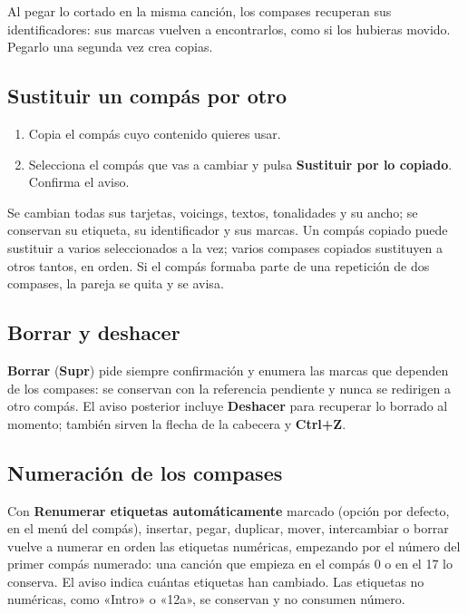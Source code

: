 \documentclass[a4paper,11pt]{article}
\providecommand{\tightlist}{\setlength{\itemsep}{2pt}\setlength{\parskip}{0pt}}
\begin{document}
Al pegar lo cortado en la misma canción, los compases recuperan sus
identificadores: sus marcas vuelven a encontrarlos, como si los hubieras
movido. Pegarlo una segunda vez crea copias.

\subsection{Sustituir un compás por
otro}\label{sustituir-un-compuxe1s-por-otro}

\begin{enumerate}
\def\labelenumi{\arabic{enumi}.}
\tightlist
\item
  Copia el compás cuyo contenido quieres usar.
\item
  Selecciona el compás que vas a cambiar y pulsa \textbf{Sustituir por
  lo copiado}. Confirma el aviso.
\end{enumerate}

Se cambian todas sus tarjetas, voicings, textos, tonalidades y su ancho;
se conservan su etiqueta, su identificador y sus marcas. Un compás
copiado puede sustituir a varios seleccionados a la vez; varios compases
copiados sustituyen a otros tantos, en orden. Si el compás formaba parte
de una repetición de dos compases, la pareja se quita y se avisa.

\subsection{Borrar y deshacer}\label{borrar-y-deshacer}

\textbf{Borrar} (\textbf{Supr}) pide siempre confirmación y enumera las
marcas que dependen de los compases: se conservan con la referencia
pendiente y nunca se redirigen a otro compás. El aviso posterior incluye
\textbf{Deshacer} para recuperar lo borrado al momento; también sirven
la flecha de la cabecera y \textbf{Ctrl+Z}.

\subsection{Numeración de los
compases}\label{numeraciuxf3n-de-los-compases}

Con \textbf{Renumerar etiquetas automáticamente} marcado (opción por
defecto, en el menú del compás), insertar, pegar, duplicar, mover,
intercambiar o borrar vuelve a numerar en orden las etiquetas numéricas,
empezando por el número del primer compás numerado: una canción que
empieza en el compás 0 o en el 17 lo conserva. El aviso indica cuántas
etiquetas han cambiado. Las etiquetas no numéricas, como «Intro» o
«12a», se conservan y no consumen número.
\end{document}
